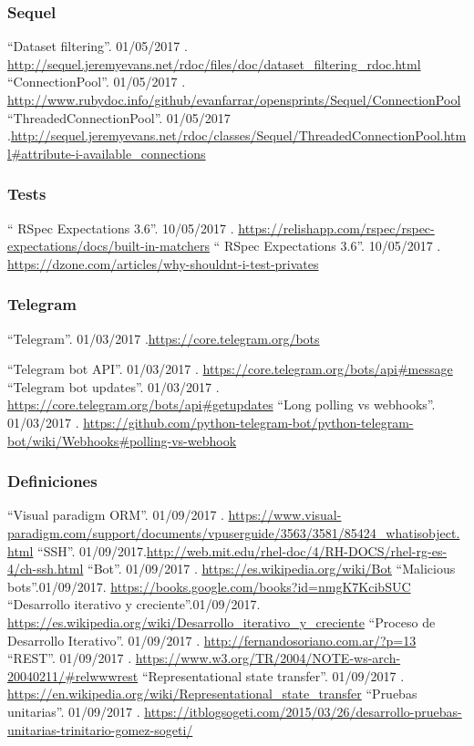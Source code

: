 \documentclass[a4paper,11pt]{book}
\begin{document}
\begin{thebibliography}{99}
\subsubsection*{Sequel}

 ``Dataset filtering''. 01/05/2017 . \url{http://sequel.jeremyevans.net/rdoc/files/doc/dataset_filtering_rdoc.html}
 ``ConnectionPool''. 01/05/2017 . \url{http://www.rubydoc.info/github/evanfarrar/opensprints/Sequel/ConnectionPool}
 ``ThreadedConnectionPool''. 01/05/2017 .\url{http://sequel.jeremyevans.net/rdoc/classes/Sequel/ThreadedConnectionPool.html#attribute-i-available_connections
}
\subsubsection*{Tests}

 `` RSpec Expectations 3.6''. 10/05/2017 . \url{https://relishapp.com/rspec/rspec-expectations/docs/built-in-matchers}
 `` RSpec Expectations 3.6''. 10/05/2017 . \url{https://dzone.com/articles/why-shouldnt-i-test-privates}

\subsubsection*{Telegram}
 ``Telegram''. 01/03/2017 .\url{https://core.telegram.org/bots}

 ``Telegram bot API''. 01/03/2017 . \url{https://core.telegram.org/bots/api#message}
 ``Telegram bot updates''. 01/03/2017 . \url{https://core.telegram.org/bots/api#getupdates}
 ``Long polling vs webhooks''. 01/03/2017 . \url{https://github.com/python-telegram-bot/python-telegram-bot/wiki/Webhooks#polling-vs-webhook}

\subsubsection*{Definiciones}
 ``Visual paradigm ORM''. 01/09/2017 . \url{https://www.visual-paradigm.com/support/documents/vpuserguide/3563/3581/85424_whatisobject.html}
 ``SSH''. 01/09/2017.\url{http://web.mit.edu/rhel-doc/4/RH-DOCS/rhel-rg-es-4/ch-ssh.html}
 ``Bot''. 01/09/2017 . \url{https://es.wikipedia.org/wiki/Bot}
 ``Malicious bots''.01/09/2017. \url{https://books.google.com/books?id=nmgK7KcibSUC}
 ``Desarrollo iterativo y creciente''.01/09/2017. \url{https://es.wikipedia.org/wiki/Desarrollo_iterativo_y_creciente}
 ``Proceso de Desarrollo Iterativo''. 01/09/2017 . \url{http://fernandosoriano.com.ar/?p=13}
 ``REST''. 01/09/2017 . \url{https://www.w3.org/TR/2004/NOTE-ws-arch-20040211/#relwwwrest}
 ``Representational state transfer''. 01/09/2017 . \url{https://en.wikipedia.org/wiki/Representational_state_transfer}
 ``Pruebas unitarias''. 01/09/2017 . \url{https://itblogsogeti.com/2015/03/26/desarrollo-pruebas-unitarias-trinitario-gomez-sogeti/
}


\end{thebibliography}
\end{document}
